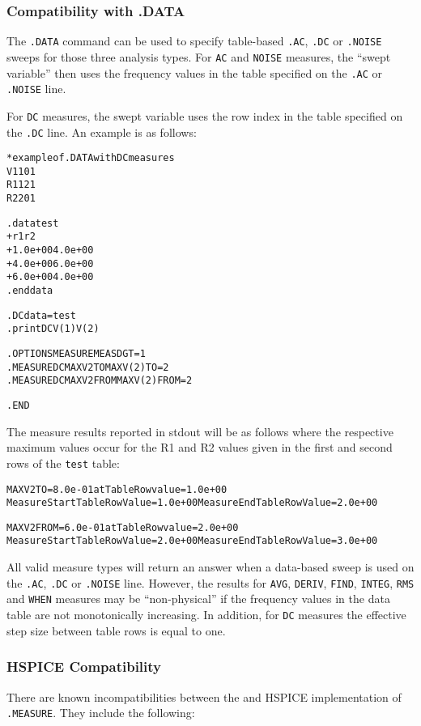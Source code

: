 \subsubsection{Compatibility with .DATA}
The \texttt{.DATA} command can be used to specify table-based \texttt{.AC},
\texttt{.DC} or \texttt{.NOISE} sweeps for those three analysis types. For
\texttt{AC} and \texttt{NOISE} measures, the ``swept variable'' then uses
the frequency values in the table specified on the \texttt{.AC} or
\texttt{.NOISE} line.

For \texttt{DC} measures, the swept variable uses the row index in the
table specified on the \texttt{.DC} line.  An example is as follows:
\begin{alltt}
* example of .DATA with DC measures
V1 1 0 1
R1 1 2 1
R2 2 0 1

.data test
+ r1           r2
+ 1.0e+00  4.0e+00
+ 4.0e+00  6.0e+00
+ 6.0e+00  4.0e+00
.enddata

.DC data=test
.print DC V(1) V(2)

.OPTIONS MEASURE MEASDGT=1
.MEASURE DC MAXV2TO MAX V(2) TO=2
.MEASURE DC MAXV2FROM MAX V(2) FROM=2

.END
\end{alltt}

The measure results reported in stdout will be as follows where the respective
maximum values occur for the R1 and R2 values given in the first and second rows
of the \texttt{test} table:
\begin{alltt}
MAXV2TO = 8.0e-01 at Table Row value = 1.0e+00
Measure Start Table Row Value= 1.0e+00  Measure End Table Row Value= 2.0e+00

MAXV2FROM = 6.0e-01 at Table Row value = 2.0e+00
Measure Start Table Row Value= 2.0e+00  Measure End Table Row Value= 3.0e+00
\end{alltt}

All valid measure types will return an answer when a data-based sweep is used
on the \texttt{.AC}, \texttt{.DC} or \texttt{.NOISE} line.  However, the results
for \texttt{AVG}, \texttt{DERIV}, \texttt{FIND}, \texttt{INTEG}, \texttt{RMS}
and \texttt{WHEN} measures may be ``non-physical'' if the frequency values in the
data table are not monotonically increasing.  In addition, for \texttt{DC} measures
the effective step size between table rows is equal to one.

\subsubsection{HSPICE Compatibility}
\label{Measure_HSpice_Compatibility}
There are known incompatibilities between the \Xyce{} and HSPICE implementation
of {\tt .MEASURE}.  They include the following:

